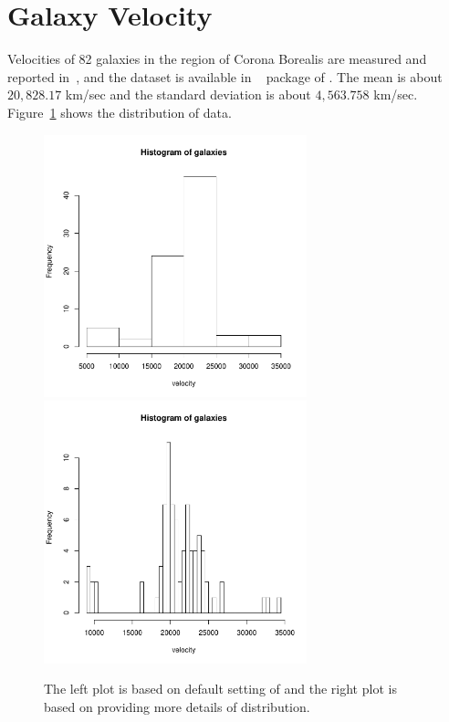 \section[Galaxy Velocity]{Galaxy Velocity}
\label{sec:galaxy}

Velocities of 82 galaxies in the region of Corona Borealis are
measured and reported in~\citep{Roeder1990}, and the  dataset is
available in ~ package of .
The mean is about $20,828.17$ km/sec and the standard deviation is about
$4,563.758$ km/sec. Figure~\ref{fig:galaxy} shows the distribution of data.
\begin{figure}[ht]
\centering
  \includegraphics[width=3.0in]{pbdDEMO-include/pics/galaxy_1}
  \includegraphics[width=3.0in]{pbdDEMO-include/pics/galaxy_2}
\caption[Histograms of velocities of 82 galaxies]{The left plot is based on
default setting of  and the right plot is based on
 providing more details of distribution.}
\label{fig:galaxy}
\end{figure}

